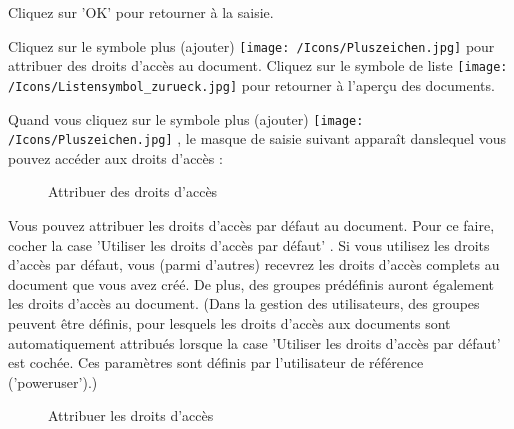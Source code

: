Cliquez sur 'OK' pour retourner à la saisie.

\vspace{\baselineskip}

Cliquez sur le symbole plus (ajouter) \texttt{[image: /Icons/Pluszeichen.jpg]}  pour attribuer des droits d'accès au document. Cliquez sur le symbole de liste \texttt{[image: /Icons/Listensymbol\_zurueck.jpg]}  pour retourner à l'aperçu des documents.

\vspace{\baselineskip}

Quand vous cliquez sur le symbole plus (ajouter) \texttt{[image: /Icons/Pluszeichen.jpg]} , le masque de saisie suivant apparaît danslequel vous pouvez accéder aux droits d'accès :

\begin{figure}[H]
\caption{Attribuer des droits d'accès}
\end{figure}

Vous pouvez attribuer les droits d'accès par défaut au document. Pour ce faire, cocher la case 'Utiliser les droits d'accès par défaut' . Si vous utilisez les droits d'accès par défaut, vous (parmi d'autres) recevrez les droits d'accès complets au document que vous avez créé. De plus, des groupes prédéfinis auront également les droits d'accès au document. (Dans la gestion des utilisateurs, des groupes peuvent être définis, pour lesquels les droits d'accès aux documents sont automatiquement attribués lorsque la case 'Utiliser les droits d'accès par défaut' est cochée. Ces paramètres sont définis par l'utilisateur de référence ('poweruser').)

\begin{figure}[H]
\caption{Attribuer les droits d'accès}
\end{figure}

